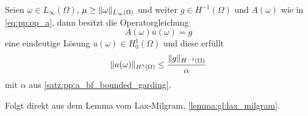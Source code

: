 \begin{Satz}
\label{satz:pp:lax_auf_elliptisch}
    Seien $\omega \in L_{\infty}(\Omega)$, $\mu \geq \lVert\omega\rVert_{L_{\infty}(\Omega)}$ und weiter $g \in H^{-1}(\Omega)$ und $A(\omega)$ wie in \cref{eq:pp:op_a}, dann besitzt die Operatorgleichung
    \begin{equation}
        A(\omega) u(\omega) = g
    \end{equation}
    eine eindeutige Lösung $u(\omega) \in H^{1}_{0}(\Omega)$ und diese erfüllt
    \begin{equation}
        \lVert u(\omega)\rVert_{H^{1}(\Omega)} \leq \frac{\lVert g\rVert_{H^{-1}(\Omega)}}{\alpha}
    \end{equation}
    mit $\alpha$ aus \cref{satz:pp:a_bf_bounded_garding}.

    \begin{Beweis}
        Folgt direkt aus dem Lemma vom Lax-Milgram, \cref{lemma:gl:lax_milgram}.
    \end{Beweis}
\end{Satz}



